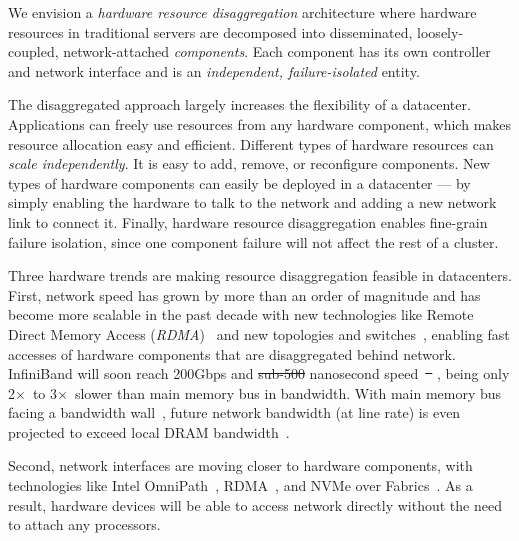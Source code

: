 \documentclass[10pt,times,twocolumn]{z2-article}
\renewcommand{\em}{\it}
\newcommand{\x}{$\times$}
\newcommand{\rdma}{RDMA}
\providecommand{\DIFaddtex}[1]{{\protect\color{blue}\uwave{#1}}} %
\providecommand{\DIFdeltex}[1]{{\protect\color{red}\sout{#1}}}                      %
\providecommand{\DIFaddbegin}{} %
\providecommand{\DIFaddend}{} %
\providecommand{\DIFdelbegin}{} %
\providecommand{\DIFdelend}{} %
\providecommand{\DIFadd}[1]{\texorpdfstring{\DIFaddtex{#1}}{#1}} %
\providecommand{\DIFdel}[1]{\texorpdfstring{\DIFdeltex{#1}}{}} %
\newcommand{\DIFscaledelfig}{0.5}
\newlength{\DIFdelgraphicswidth} %
\newlength{\DIFdelgraphicsheight} %
\newcommand{\DIFaddincludegraphics}[2][]{{\color{blue}\fbox{\DIFOincludegraphics[#1]{#2}}}} %
\newcommand{\DIFdelincludegraphics}[2][]{%
\sbox{\DIFdelgraphicsbox}{\DIFOincludegraphics[#1]{#2}}%
\settoboxwidth{\DIFdelgraphicswidth}{\DIFdelgraphicsbox} %
\settoboxtotalheight{\DIFdelgraphicsheight}{\DIFdelgraphicsbox} %
\scalebox{\DIFscaledelfig}{%
\parbox[b]{\DIFdelgraphicswidth}{\usebox{\DIFdelgraphicsbox}\\[-\baselineskip] \rule{\DIFdelgraphicswidth}{0em}}\llap{\resizebox{\DIFdelgraphicswidth}{\DIFdelgraphicsheight}{%
\setlength{\unitlength}{\DIFdelgraphicswidth}%
\begin{picture}(1,1)%
\thicklines\linethickness{2pt} %
{\color[rgb]{1,0,0}\put(0,0){\framebox(1,1){}}}%
{\color[rgb]{1,0,0}\put(0,0){\line( 1,1){1}}}%
{\color[rgb]{1,0,0}\put(0,1){\line(1,-1){1}}}%
\end{picture}%
}\hspace*{3pt}}} %
} %
\DeclareRobustCommand{\DIFaddbegin}{\DIFOaddbegin \let\includegraphics\DIFaddincludegraphics} %
\DeclareRobustCommand{\DIFaddend}{\DIFOaddend \let\includegraphics\DIFOincludegraphics} %
\DeclareRobustCommand{\DIFdelbegin}{\DIFOdelbegin \let\includegraphics\DIFdelincludegraphics} %
\DeclareRobustCommand{\DIFdelend}{\DIFOaddend \let\includegraphics\DIFOincludegraphics} %
\begin{document}
{We envision a {\em hardware resource disaggregation} architecture 
where hardware resources in traditional servers are decomposed into disseminated, loosely-coupled, network-attached {\em components}.
Each component has its own controller and network interface
and is an {\em independent, failure-isolated} entity.

The disaggregated approach largely increases the flexibility of a datacenter.
Applications can freely use resources from any hardware component,
which makes resource allocation easy and efficient.
Different types of hardware resources can {\em scale independently}.
It is easy to add, remove, or reconfigure components.
New types of hardware components can easily be deployed in a datacenter ---
by simply enabling the hardware to talk to the network and adding a new network link to connect it.
Finally, hardware resource disaggregation enables fine-grain failure isolation, %
since one component failure will not affect the rest of a cluster.

Three hardware trends are making resource disaggregation feasible in datacenters.
First, network speed has grown by more than an order of magnitude and has become more scalable in the past decade %
with new technologies like Remote Direct Memory Access ({\em \rdma})~\cite{ibverbs} 
and new topologies and switches~\cite{FireBox-FASTKeynote,costa15-r2c2,Costa-WRSC14},
enabling fast accesses of hardware components that are disaggregated behind network.
InfiniBand will soon reach 200Gbps and \DIFdelbegin \DIFdel{sub-500 }\DIFdelend \DIFaddbegin \DIFadd{sub-600 }\DIFaddend nanosecond speed~\DIFdelbegin \DIFdel{\mbox{%
\cite{Mellanox-ConnectX6,Mellanox-ConnectX6-IB,Mellanox-Switch}}%
}\DIFdelend \DIFaddbegin \DIFadd{\mbox{%
\cite{Mellanox-ConnectX6-IB}}%
}\DIFaddend ,
being only 2\x\ to 3\x\ slower than main memory bus in bandwidth.
With main memory bus facing a bandwidth wall~\cite{BW-Wall-ISCA09},
future network bandwidth (at line rate) is even projected to exceed local DRAM bandwidth~\cite{CacheCloud-hotcloud18}.

Second, network interfaces are moving closer to hardware components,
with technologies like Intel OmniPath~\cite{OmniPath},
RDMA~\cite{ibverbs},
and NVMe over Fabrics~\cite{NVMe-fabrics-Inteltalk,NVMe-fabrics}.
As a result, hardware devices will be able to access network directly 
without the need to attach any processors. 

}
\end{document}
